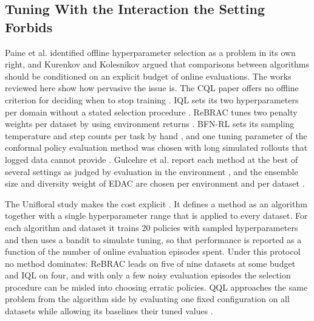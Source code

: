 \documentclass[conference]{IEEEtran}
\begin{document}
\subsection{Tuning With the Interaction the Setting Forbids}
Paine et al. \cite{paine2020hyperparameter} identified offline hyperparameter selection as a problem in its own right, and Kurenkov and Kolesnikov \cite{kurenkov2022budget} argued that comparisons between algorithms should be conditioned on an explicit budget of online evaluations. The works reviewed here show how pervasive the issue is. The CQL paper offers no offline criterion for deciding when to stop training \cite{kumar2020cql}. IQL sets its two hyperparameters per domain without a stated selection procedure \cite{kostrikov2022iql}. ReBRAC tunes two penalty weights per dataset by using environment returns \cite{tarasov2023rebrac}. BFN-RL sets its sampling temperature and step counts per task by hand \cite{killingberg2026bfn}, and one tuning parameter of the conformal policy evaluation method was chosen with long simulated rollouts that logged data cannot provide \cite{gan2025conformal}. Gulcehre et al. report each method at the best of several settings as judged by evaluation in the environment \cite{gulcehre2020brr}, and the ensemble size and diversity weight of EDAC are chosen per environment and per dataset \cite{an2021edac}.

The Unifloral study makes the cost explicit \cite{jackson2025unifloral}. It defines a method as an algorithm together with a single hyperparameter range that is applied to every dataset. For each algorithm and dataset it trains 20 policies with sampled hyperparameters and then uses a bandit to simulate tuning, so that performance is reported as a function of the number of online evaluation episodes spent. Under this protocol no method dominates: ReBRAC leads on five of nine datasets at some budget and IQL on four, and with only a few noisy evaluation episodes the selection procedure can be misled into choosing erratic policies. QQL approaches the same problem from the algorithm side by evaluating one fixed configuration on all datasets while allowing its baselines their tuned values \cite{gao2026qql}.
\end{document}
